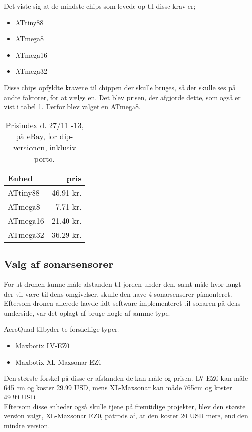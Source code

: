 \documentclass[Main]{subfiles}
\begin{document}
Det viste sig at de mindste chips som levede op til disse krav er;

\begin{itemize}
\item ATtiny88
\item ATmega8
\item ATmega16
\item ATmega32
\end{itemize}


Disse chips opfyldte kravene til chippen der skulle bruges, så der skulle ses på andre faktorer, for at vælge en. 
Det blev prisen, der afgjorde dette, som også er vist i tabel \ref{Tab:prisIndex}.
Derfor blev valget en ATmega8.

\begin{table}[H]
\centering
	\begin{tabular}{l r}\hline
	Enhed & pris \\ \hline
	ATtiny88 & 46,91 kr.\\
	ATmega8  & 7,71 kr.\\
	ATmega16 & 21,40 kr.\\
	ATmega32 & 36,29 kr. \\ \hline
	\end{tabular}
\caption{Prisindex d. 27/11 -13, på eBay, for dip-versionen, inklusiv porto.}
\label{Tab:prisIndex}
\end{table}



\subsection{Valg af sonarsensorer}
For at dronen kunne måle afstanden til jorden under den, samt måle hvor langt der vil være til dens omgivelser, skulle den have 4 sonarsensorer påmonteret.
Eftersom dronen allerede havde lidt software implementeret til sonaren på dens underside, var det oplagt af bruge nogle af samme type.


AeroQuad tilbyder to forskellige typer: 
\begin{itemize}
\item Maxbotix LV-EZ0 \cite{LV-EZ0}
\item Maxbotix XL-Maxsonar EZ0 \cite{XL-EZ0}
\end{itemize}

Den største forskel på disse er afstanden de kan måle og prisen.
LV-EZ0 kan måle 645 cm og koster 29.99 USD, mens XL-Maxsonar kan måde 765cm og koster 49.99 USD.
\\
Eftersom disse enheder også skulle tjene på fremtidige projekter, blev den største version valgt, XL-Maxsonar EZ0, påtrods af, at den koster 20 USD mere, end den mindre version.
\end{document}
